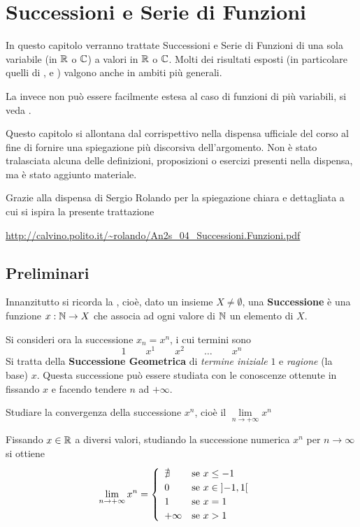 \chapter{Successioni e Serie di Funzioni}
In questo capitolo verranno trattate Successioni e Serie di Funzioni di una sola variabile (in $\mathbb{R}$ o $\mathbb{C}$) a valori in $\mathbb{R}$ o $\mathbb{C}$. Molti dei risultati esposti (in particolare quelli di ,  e ) valgono anche in ambiti più generali.

La  invece non può essere facilmente estesa al caso di funzioni di più variabili, si veda .

\vspace*{\baselineskip}
Questo capitolo si allontana dal corrispettivo nella dispensa ufficiale del corso al fine di fornire una spiegazione più discorsiva dell'argomento. Non è stato tralasciata alcuna delle definizioni, proposizioni o esercizi presenti nella dispensa, ma è stato aggiunto materiale.

Grazie alla dispensa di Sergio Rolando per la spiegazione chiara e dettagliata a cui si ispira la presente trattazione
\begin{center}
	\url{http://calvino.polito.it/~rolando/An2s_04_Successioni.Funzioni.pdf}
\end{center}

\section{Preliminari}\label{sect:prelim_serie_succ_funz}
Innanzitutto si ricorda la , cioè, dato un insieme $X \neq \emptyset$, una \textbf{Successione} è una funzione $x: \mathbb{N} \to X$ che associa ad ogni valore di $\mathbb{N}$ un elemento di $X$.

Si consideri ora la successione $x_n = x^n$, i cui termini sono
\[1 \qquad x^1 \qquad x^2  \qquad \dots \qquad x^n\]
Si tratta della \textbf{Successione Geometrica} di \textit{termine iniziale} $1$ e \textit{ragione} (la base) $x$. Questa successione può essere studiata con le conoscenze ottenute in  fissando $x$ e facendo tendere $n$ ad $+\infty$.
\begin{example}
	\label{ex:conv_succ_xn}
	Studiare la convergenza della successione $x^n$, cioè il $\lim\limits_{n \to +\infty} x^n$
	\begin{solution}
		Fissando $x \in \mathbb{R}$ a diversi valori, studiando la successione numerica $x^n$ per $n \to \infty$ si ottiene
		\[
			\lim\limits_{n \to +\infty} x^n =
			\begin{cases}
				\begin{array}{ll}
					\nexists & \text{se } x \leq -1\\
					0 & \text{se } x \in \left]-1,1\right[\\
					1 & \text{se } x = 1\\
					+\infty & \text{se } x > 1
				\end{array}
			\end{cases}
		\]
	\end{solution}
\end{example}

